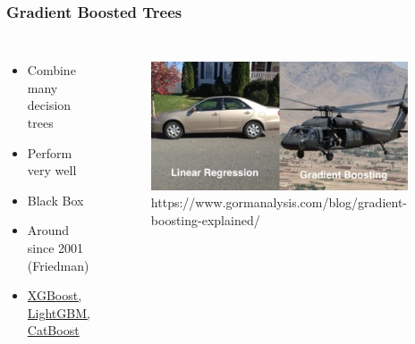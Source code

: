 \documentclass[
    utf8,
    aspectratio=169
]{beamer}  %
\begin{document}
\begin{frame}
	\frametitle{Gradient Boosted Trees}
	\begin{columns}[onlytextwidth]
		\begin{itemize}
			\item Combine many decision trees
			\item Perform very well
			\item Black Box
			\item Around since 2001 (Friedman)
			\item \href{https://github.com/mayer79/gradient_boosting_comparison}{XGBoost, LightGBM, CatBoost}
		\end{itemize}
		
		\begin{figure}
			\includegraphics[width=0.95\textwidth]{pics/helicopter.jpg}
			\tiny{https://www.gormanalysis.com/blog/gradient-boosting-explained/}
		\end{figure}
	\end{columns}
\end{frame}
\end{document}
